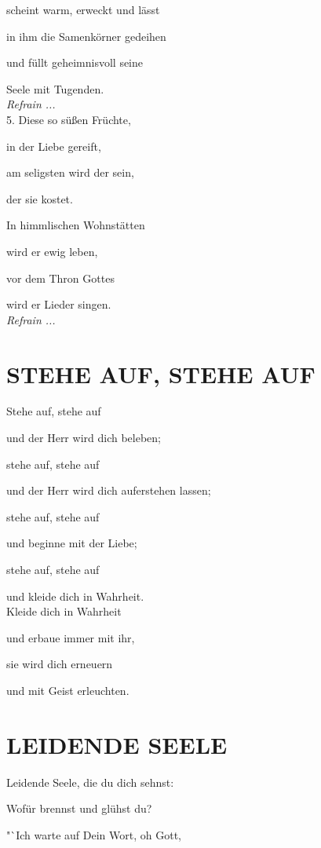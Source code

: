 \documentclass[11pt,a5paper,twoside]{article}
\begin{document}
scheint warm, erweckt und lässt

in ihm die Samenkörner gedeihen

und füllt geheimnisvoll seine

Seele mit Tugenden.\\


\textit{Refrain ...}\\


5. Diese so süßen Früchte,

in der Liebe gereift,

am seligsten wird der sein,

der sie kostet.

In himmlischen Wohnstätten

wird er ewig leben,

vor dem Thron Gottes

wird er Lieder singen. \\

\textit{Refrain ...}



\section[Stehe auf, stehe auf]{STEHE AUF, STEHE AUF}

Stehe auf, stehe auf

und der Herr wird dich beleben;

stehe auf, stehe auf

und der Herr wird dich auferstehen lassen; 

stehe auf, stehe auf 

und beginne mit der Liebe;

stehe auf, stehe auf 

und kleide dich in Wahrheit.\\

Kleide dich in Wahrheit

und erbaue immer mit ihr,

sie wird dich erneuern

und mit Geist erleuchten.

\section[Leidende Seele]{LEIDENDE SEELE}

Leidende Seele, die du dich sehnst:

Wofür brennst und glühst du? 

"`Ich warte auf Dein Wort, oh Gott,
\end{document}
